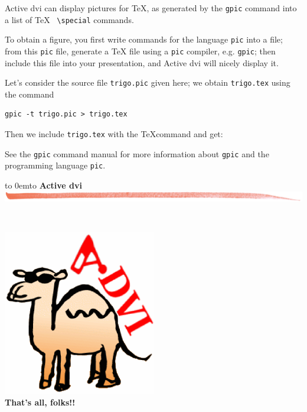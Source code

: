 \documentclass[12pt]{article}
\def\advifooter{\vbox to 0em{\vbox to \vsize {\vfill
Press: \underline{n}ext page \underline{p}revious page
\underline{\textvisiblespace} next pause} \vss}}
\def\adviheader{\noindent
{\bf\Large Active dvi}\\
\includegraphics[width=\textwidth]{bar.jpg.eps}}
\let \Newpage \newpage
\def \newpage {\Newpage \advifooter\adviheader}
\def\adviemptyfooter{\vbox to 0em{\vbox to \vsize {\vfill
~~} \vss}}
\def\lastpage{\Newpage\adviemptyfooter\adviheader}
\begin{document}
Active dvi can display pictures for \TeX, as generated by
the \verb"gpic" command into a list of \TeX~ \verb"\special" commands.

\bigskip

To obtain a figure, you first write commands for the language
\verb"pic" into a file; from this \verb"pic" file, generate a \TeX
file using a \verb"pic" compiler, e.g. \verb"gpic"; then include this
file into your presentation, and Active dvi will nicely display it.

Let's consider the source file \verb"trigo.pic" given here; we obtain
\verb"trigo.tex" using the command 
\begin{verbatim}
gpic -t trigo.pic > trigo.tex
\end{verbatim}

Then we include \verb"trigo.tex" with the \TeX command
\verb|| and get:

\def\showgraph{%
  \par\medskip\centerline{\raise 1em\box\graph}\bigskip\noindent\ignorespaces}



See the \verb"gpic" command manual for more information about
\verb"gpic" and the programming language \verb"pic".

\lastpage

~\vfill
\begin{center}
\includegraphics[width=0.5\textwidth]{advilogo.eps}\\
{\Large \bf That's all, folks!!}
\end{center}
\vfill
\end{document}
